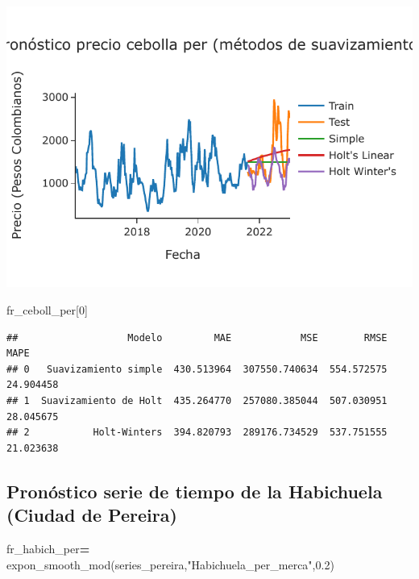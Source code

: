 \documentclass[
]{book}
\newenvironment{Shaded}{\begin{snugshade}}{\end{snugshade}}
\newcommand{\DecValTok}[1]{\textcolor[rgb]{0.00,0.00,0.81}{#1}}
\newcommand{\FloatTok}[1]{\textcolor[rgb]{0.00,0.00,0.81}{#1}}
\newcommand{\NormalTok}[1]{#1}
\newcommand{\OperatorTok}[1]{\textcolor[rgb]{0.81,0.36,0.00}{\textbf{#1}}}
\newcommand{\StringTok}[1]{\textcolor[rgb]{0.31,0.60,0.02}{#1}}
\begin{document}
\includegraphics{bookdown-demo_files/figure-latex/unnamed-chunk-142-129.pdf}

\begin{Shaded}
\begin{Highlighting}[]

\NormalTok{fr\_ceboll\_per[}\DecValTok{0}\NormalTok{]}
\end{Highlighting}
\end{Shaded}

\begin{verbatim}
##                   Modelo         MAE            MSE        RMSE       MAPE
## 0   Suavizamiento simple  430.513964  307550.740634  554.572575  24.904458
## 1  Suavizamiento de Holt  435.264770  257080.385044  507.030951  28.045675
## 2           Holt-Winters  394.820793  289176.734529  537.751555  21.023638
\end{verbatim}

\hypertarget{pronuxf3stico-serie-de-tiempo-de-la-habichuela-ciudad-de-pereira}{%
\subsection{Pronóstico serie de tiempo de la Habichuela (Ciudad de Pereira)}\label{pronuxf3stico-serie-de-tiempo-de-la-habichuela-ciudad-de-pereira}}

\begin{Shaded}
\begin{Highlighting}[]

\NormalTok{fr\_habich\_per}\OperatorTok{=}\NormalTok{ expon\_smooth\_mod(series\_pereira,}\StringTok{"Habichuela\_per\_merca"}\NormalTok{,}\FloatTok{0.2}\NormalTok{)}
\end{Highlighting}
\end{Shaded}
\end{document}
